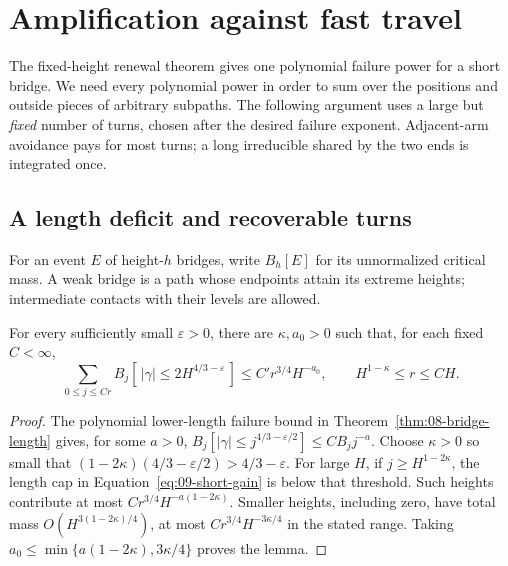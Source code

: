 \section{Amplification against fast travel}\label{sec:fast}
The fixed-height renewal theorem gives one polynomial failure power for a
short bridge. We need every polynomial power in order to sum over the
positions and outside pieces of arbitrary subpaths. The following argument
uses a large but \emph{fixed} number of turns, chosen after the desired
failure exponent. Adjacent-arm avoidance pays for most turns; a long
irreducible shared by the two ends is integrated once.

\subsection{A length deficit and recoverable turns}

For an event \(E\) of height-\(h\) bridges, write \(B_h[E]\) for
its unnormalized critical mass.  A weak bridge is a path whose endpoints
attain its extreme heights; intermediate contacts with their levels
are allowed.

\begin{lemma}\label{09_fast_paths:integrated-short}
For every sufficiently small \(\varepsilon>0\), there are
\(\kappa,a_0>0\) such that, for each fixed \(C<\infty\),
\begin{equation}
 \sum_{0\le j\le Cr}B_j[\,|\gamma|\le2H^{4/3-\varepsilon}\,]
       \le C' r^{3/4}H^{-a_0},
 \qquad H^{1-\kappa}\le r\le CH.                 \label{eq:09-short-gain}
\end{equation}
\end{lemma}
\begin{proof}
The polynomial lower-length failure bound in
Theorem~\ref{thm:08-bridge-length} gives, for some \(a>0\),
\(B_j[|\gamma|\le j^{4/3-\varepsilon/2}]
\le C B_jj^{-a}\).  Choose \(\kappa>0\) so small that
\((1-2\kappa)(4/3-\varepsilon/2)>4/3-\varepsilon\).
For large \(H\), if \(j\ge H^{1-2\kappa}\), the length cap in
Equation~\eqref{eq:09-short-gain} is below that threshold.  Such
heights contribute at most
\(Cr^{3/4}H^{-a(1-2\kappa)}\).  Smaller heights, including zero,
have total mass \(O(H^{3(1-2\kappa)/4})\), at most
\(Cr^{3/4}H^{-3\kappa/4}\) in the stated range.  Taking
\(a_0\le\min\{a(1-2\kappa),3\kappa/4\}\) proves the lemma.
\end{proof}

